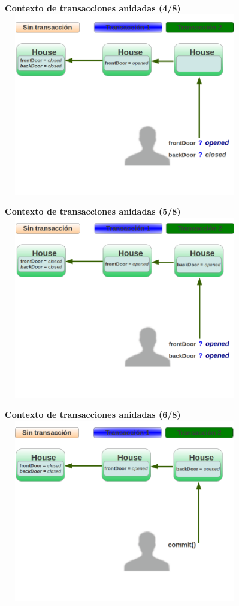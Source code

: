 	{\bf Contexto de transacciones anidadas (4/8)}\\
	\includegraphics[width=400px, height=300px]{img/contextoAninado4}
	
	{\bf Contexto de transacciones anidadas (5/8)}\\
	\includegraphics[width=400px, height=300px]{img/contextoAninado5}

	{\bf Contexto de transacciones anidadas (6/8)}\\
	\includegraphics[width=400px, height=300px]{img/contextoAninado6}

